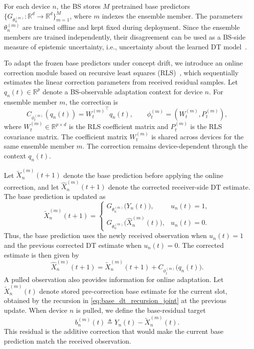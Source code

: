 \documentclass[conference]{IEEEtran}
\begin{document}
For each device \(n\), the BS stores \(M\) pretrained base predictors
\(\{G_{\theta_n^{(m)}}:\mathbb R^d\to\mathbb R^d\}_{m=1}^{M}\), where
\(m\) indexes the ensemble member. The parameters
\(\theta_n^{(m)}\) are trained offline and kept fixed during deployment.
Since the ensemble members are trained independently, their disagreement
can be used as a BS-side measure of epistemic uncertainty, i.e., uncertainty
about the learned DT model~\cite{waegeman21}.

To adapt the frozen base predictors under concept drift, we introduce an online
correction module based on recursive least squares (RLS)~\cite{RLS}, which sequentially
estimates the linear correction parameters from received residual samples. Let
\(q_n(t)\in\mathbb R^p\) denote a BS-observable adaptation context for device
\(n\). For ensemble member \(m\), the correction is
\begin{equation}
\label{eq:rls_corrector}
C_{\phi_t^{(m)}}(q_n(t))
=
{W_t^{(m)}}^\top q_n(t),
\qquad
\phi_t^{(m)}=(W_t^{(m)},P_t^{(m)}),
\end{equation}
where \(W_t^{(m)}\in\mathbb R^{p\times d}\) is the RLS coefficient matrix
and \(P_t^{(m)}\) is the RLS covariance matrix. The coefficient matrix
\(W_t^{(m)}\) is shared across devices for the same ensemble member \(m\).
The correction remains device-dependent through the context \(q_n(t)\).

Let \(\tilde X_n^{(m)}(t+1)\) denote the base prediction before applying the
online correction, and let \(\hat X_n^{(m)}(t+1)\) denote the corrected
receiver-side DT estimate. The base prediction is updated as
\begin{equation}
\label{eq:base_dt_recursion_joint}
\tilde X_n^{(m)}(t+1)
=
\begin{cases}
G_{\theta_n^{(m)}}\!\big(Y_n(t)\big), & u_n(t)=1,\\
G_{\theta_n^{(m)}}\!\big(\hat X_n^{(m)}(t)\big), & u_n(t)=0.
\end{cases}
\end{equation}
Thus, the base prediction uses the newly received observation when
\(u_n(t)=1\) and the previous corrected DT estimate when \(u_n(t)=0\). The corrected estimate is then given by
\begin{equation}
\label{eq:corrected_dt_recursion_joint}
\hat X_n^{(m)}(t+1)
=
\tilde X_n^{(m)}(t+1)
+
C_{\phi_t^{(m)}}\!\big(q_n(t)\big).
\end{equation}
A pulled observation also provides information for online adaptation. Let
\(\tilde X_n^{(m)}(t)\) denote stored pre-correction base estimate for the current slot, obtained by the recursion in \eqref{eq:base_dt_recursion_joint} at the previous update. When device \(n\) is pulled, we define
the base-residual target
\begin{equation}
\label{eq:base_residual_supervision}
b_n^{(m)}(t)
\triangleq
Y_n(t)-\tilde X_n^{(m)}(t).
\end{equation}
This residual is the additive correction that would make the current base
prediction match the received observation.
\end{document}
